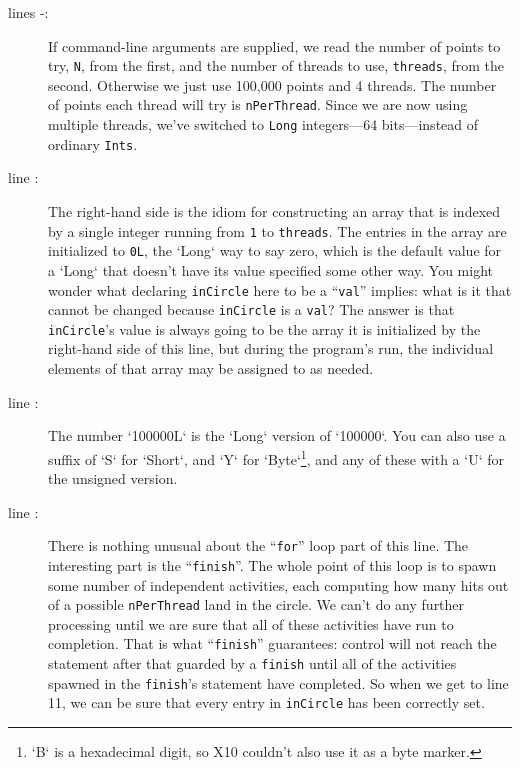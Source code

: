\begin{description}
\item[lines -:] 
If command-line arguments are supplied, we read the number of points to try, {\tt N},
from the first, and
the number of threads to use, {\tt threads}, from the second.  Otherwise we just use
100,000 points and 4 threads. The number of points each thread will try is {\tt nPerThread}.  Since we
are now using multiple threads, we've switched to {\tt Long} integers---64
bits---instead of ordinary {\tt Ints}.
\item[line :]
The right-hand side is the \Xten{} idiom for constructing an array that is indexed
by a single integer running from {\tt 1} to {\tt threads}.  
The
entries in the array are initialized to {\tt 0L}, the \xcd`Long` way to say
zero, which is the default value for a \xcd`Long` that doesn't have its value
specified some other way.
You might wonder what
declaring {\tt inCircle} here to be a ``{\tt val}'' implies: what is
it that cannot be changed because {\tt inCircle} is a {\tt val}?  The answer
is that {\tt inCircle}'s value is always going to be the array it is initialized
by the right-hand side of this line, but during the program's run, the individual
elements of that array may be assigned to as needed.

\item [line :] The number \xcd`100000L` is the \xcd`Long`
      version of \xcd`100000`.  You can also use a suffix of \xcd`S` for
      \xcd`Short`, and \xcd`Y` for \xcd`Byte`\footnote{\xcd`B` is a
      hexadecimal digit, so X10 couldn't also use it as a byte marker.}, and
      any of these with a \xcd`U` 
      for the unsigned version.



\item[line :] There is nothing unusual about the ``{\tt for}'' loop part of
this line. The interesting part is the ``{\tt finish}''.  The whole
point of this loop is to spawn some number of
independent activities, each computing how many hits
out of a possible  {\tt nPer\-Thread} land in the circle.  We can't do any
further processing until we are sure that all of these activities have run to
completion.  That is what ``{\tt finish}'' guarantees: control will not reach
the statement after that guarded by a {\tt finish} until all of the activities
spawned in the {\tt finish}'s statement have completed.  So when we get to line
11, we can be sure that every entry in {\tt inCircle} has been correctly set.


\end{description}
